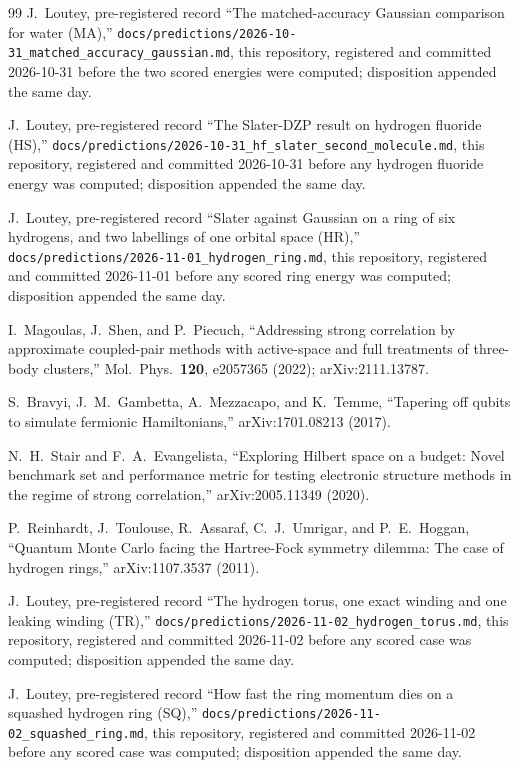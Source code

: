 \documentclass[aps,pra,twocolumn,superscriptaddress,longbibliography]{revtex4-2}
\begin{document}
\begin{thebibliography}{99}
J.~Loutey, pre-registered record ``The matched-accuracy Gaussian
comparison for water (MA),''
\texttt{docs/predictions/2026-10-31\_matched\_accuracy\_gaussian.md},
this repository, registered and committed 2026-10-31 before the two
scored energies were computed; disposition appended the same day.

J.~Loutey, pre-registered record ``The Slater-DZP result on hydrogen
fluoride (HS),''
\texttt{docs/predictions/2026-10-31\_hf\_slater\_second\_molecule.md},
this repository, registered and committed 2026-10-31 before any
hydrogen fluoride energy was computed; disposition appended the same
day.

J.~Loutey, pre-registered record ``Slater against Gaussian on a ring of
six hydrogens, and two labellings of one orbital space (HR),''
\texttt{docs/predictions/2026-11-01\_hydrogen\_ring.md}, this repository,
registered and committed 2026-11-01 before any scored ring energy was
computed; disposition appended the same day.

I.~Magoulas, J.~Shen, and P.~Piecuch, ``Addressing strong correlation by
approximate coupled-pair methods with active-space and full treatments of
three-body clusters,'' Mol.\ Phys.\ \textbf{120}, e2057365 (2022);
arXiv:2111.13787.

S.~Bravyi, J.~M.~Gambetta, A.~Mezzacapo, and K.~Temme, ``Tapering off
qubits to simulate fermionic Hamiltonians,'' arXiv:1701.08213 (2017).

N.~H.~Stair and F.~A.~Evangelista, ``Exploring Hilbert space on a budget:
Novel benchmark set and performance metric for testing electronic
structure methods in the regime of strong correlation,''
arXiv:2005.11349 (2020).

P.~Reinhardt, J.~Toulouse, R.~Assaraf, C.~J.~Umrigar, and P.~E.~Hoggan,
``Quantum Monte Carlo facing the Hartree-Fock symmetry dilemma: The case
of hydrogen rings,'' arXiv:1107.3537 (2011).

J.~Loutey, pre-registered record ``The hydrogen torus, one exact winding
and one leaking winding (TR),''
\texttt{docs/predictions/2026-11-02\_hydrogen\_torus.md}, this repository,
registered and committed 2026-11-02 before any scored case was computed;
disposition appended the same day.

J.~Loutey, pre-registered record ``How fast the ring momentum dies on a
squashed hydrogen ring (SQ),''
\texttt{docs/predictions/2026-11-02\_squashed\_ring.md}, this repository,
registered and committed 2026-11-02 before any scored case was computed;
disposition appended the same day.


\end{thebibliography}
\end{document}
